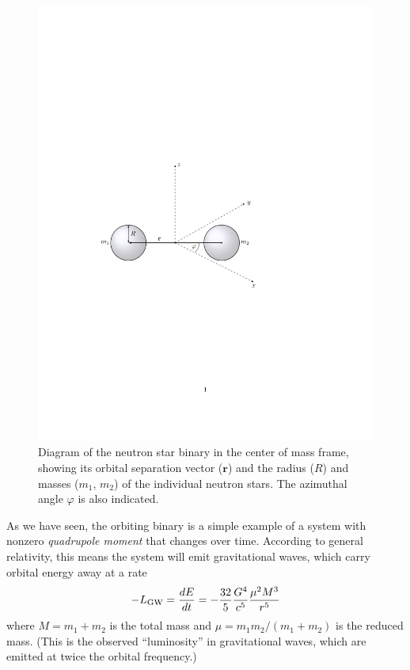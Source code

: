 \documentclass[11pt]{article}
\begin{document}
\begin{figure}[!h]
\begin{mdframed}
\centering
\includegraphics{relativistic_orbit/binary_diagram.pdf}
\caption{\label{fig:binary_diagram}Diagram of the neutron star binary in the center of mass frame, showing its orbital separation vector ($\mathbf{r}$) and the radius ($R$) and masses ($m_1$, $m_2$) of the individual neutron stars. The azimuthal angle $\varphi$ is also indicated.}
\end{mdframed}
\end{figure}

\vspace{10pt}

As we have seen, the orbiting binary is a simple example of a system with nonzero \textit{quadrupole moment} that changes over time. According to general relativity, this means the system will emit gravitational waves, which carry orbital energy away at a rate
\begin{equation}\label{eq:GW_luminosity}
-L_{\rm GW} = \frac{dE}{dt} = - \frac{32}{5} \frac{G^4}{c^5} \frac{\mu^2 M^3}{r^5}
\end{equation}
where $M = m_1 + m_2$ is the total mass and $\mu = m_1 m_2/(m_1 + m_2)$ is the reduced mass. (This is the observed ``luminosity'' in gravitational waves, which are emitted at twice the orbital frequency.)
\end{document}

